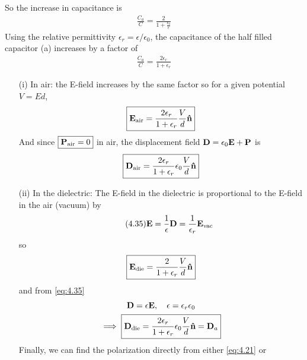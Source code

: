 \documentclass[../main.tex]{subfiles}
\begin{document}
\begin{itemize}
    So the increase in capacitance is
    \begin{align*}
        \frac{C_a}{C} = \frac{2}{1 + \frac{\epsilon_0}{\epsilon}}
    \end{align*}
    Using the relative permittivity $\epsilon_r = \epsilon/\epsilon_0$, the capacitance of the half filled capacitor (a) increases by a factor of 
    \begin{align*}
        \boxed{
            \frac{C_a}{C} = \frac{2\epsilon_r}{1 + \epsilon_r}
        }
    \end{align*}
    \begin{itemize}
        \item [(i)] In air: the E-field increases by the same factor so for a given potential $V = Ed$,
        \begin{align*}
            \boxed{
                \vb E_\text{air} = \frac{2\epsilon_r}{1 + \epsilon_r} \frac{V}{d} \vu n
            }
        \end{align*}
        And since $\boxed{\vb P_\text{air} = 0}$ in air, the displacement field $\vb D = \epsilon_0 \vb E + \vb P$ is
        \begin{align*}
            \boxed{
                \vb D_\text{air} = \frac{2\epsilon_r}{1 + \epsilon_r} \epsilon_0 \frac{V}{d} \vu n
            }
        \end{align*}
        \item [(ii)] In the dielectric: The E-field in the dielectric is proportional to the E-field in the air (vacuum) by
        \begin{align*} \tag{4.35} \label{eq:4.35}
            \vb E = \frac{1}{\epsilon} \vb D = \frac{1}{\epsilon_r} \vb E_\text{vac}
        \end{align*}
        so
        \begin{align*}
            \boxed{
                \vb E_\text{die} = \frac{2}{1 + \epsilon_r} \frac{V}{d} \vu n
            }
        \end{align*}
        and from \eqref{eq:4.35}
        \begin{gather*}
            \vb D = \epsilon \vb E, \quad \epsilon = \epsilon_r \epsilon_0 \\
            \implies \boxed{
                \vb D_\text{die} = \frac{2\epsilon_r}{1 + \epsilon_r} \epsilon_0 \frac{V}{d} \vu n = \vb D_a
            }
        \end{gather*}
        Finally, we can find the polarization directly from either \eqref{eq:4.21} or 
        \begin{align*} \tag{4.30} \label{eq:4.30}

\end{align*}
\end{itemize}
\end{itemize}
\end{document}
